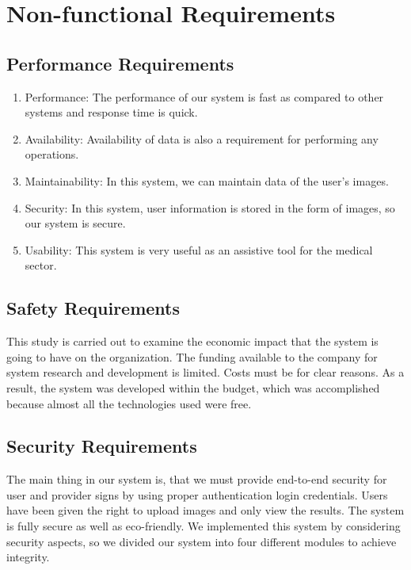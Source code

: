 \section{Non-functional Requirements}
\subsection{ Performance Requirements}

\begin{enumerate}
    \item Performance: The performance of our system is fast as compared to other systems and response time is quick.
    \item Availability: Availability of data is also a requirement for performing any operations.
    \item Maintainability: In this system, we can maintain data of the user’s images.
    \item Security: In this system, user information is stored in the form of images, so our system is secure.
    \item Usability: This system is very useful as an assistive tool for the medical sector.
\end{enumerate}

\subsection{Safety Requirements}

This study is carried out to examine the economic impact that the system is going to have on the organization. The funding available to the company for system research and development is limited. Costs must be for clear reasons. As a result, the system was developed within the budget, which was accomplished because almost all the technologies used were free.

\subsection{Security Requirements}

The main thing in our system is, that we must provide end-to-end security for user and provider signs by using proper authentication login credentials. Users have been given the right to upload images and only view the results. The system is fully secure as well as eco-friendly. We implemented this system by considering security aspects, so we divided our system into four different modules to achieve integrity.


